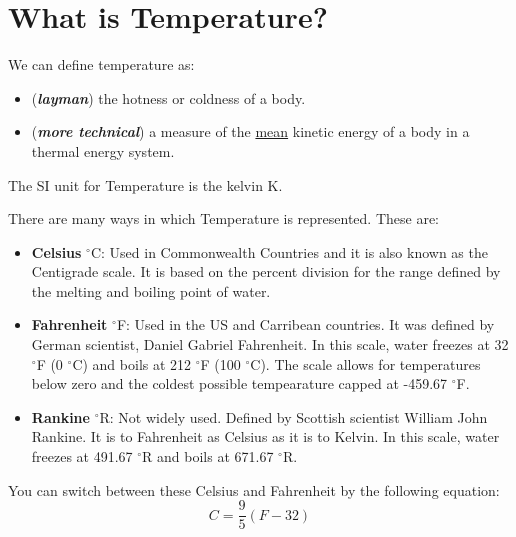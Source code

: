     \section{What is Temperature?}
    We can define temperature as:
    \begin{itemize}
        \item (\textbf{\textit{layman}}) the hotness or coldness of a body.
        \item (\textbf{\textit{more technical}}) a measure of the
        \underline{mean} kinetic energy of a body in a thermal energy system.
    \end{itemize}
    The SI unit for Temperature is the kelvin \unit{K}.
    \begin{tcolorbox}[colback=yellow!30!white,
                      colframe=yellow!70!black,
                      title={Just a heads up...}]
        There are many ways in which Temperature is represented. These are:
        \begin{itemize}
            \item \textbf{Celsius} $^{\circ}$\unit{C}: Used in Commonwealth
                Countries and it is also known as the Centigrade scale. It is
                based on the percent division for the range defined by the
                melting and boiling point of water.
            \item \textbf{Fahrenheit} $^{\circ}$\unit{F}: Used in the US and
                Carribean countries. It was defined by German scientist, Daniel
                Gabriel Fahrenheit. In this scale, water freezes at
                32 $^{\circ}$\unit{F}  (0 $^{\circ}$\unit{C}) and
                boils at 212 $^{\circ}$\unit{F}
                (100 $^{\circ}$\unit{C}). The scale allows for
                temperatures below zero and the coldest possible
                tempearature capped at -459.67 $^{\circ}$\unit{F}.
            \item \textbf{Rankine} $^{\circ}$\unit{R}: Not widely used.
                Defined by Scottish scientist William John Rankine. It is to
                Fahrenheit as Celsius as it is to Kelvin. In this scale, water
                freezes at 491.67 $^{\circ}$\unit{R} and boils at
                671.67 $^{\circ}$\unit{R}.
        \end{itemize}

        You can switch between these Celsius and Fahrenheit by the following
        equation:
        \begin{equation}
            C=\frac{9}{5}\left(F-32\right)
            \label{eq:celsius_conversion}
        \end{equation}
    \end{tcolorbox}
